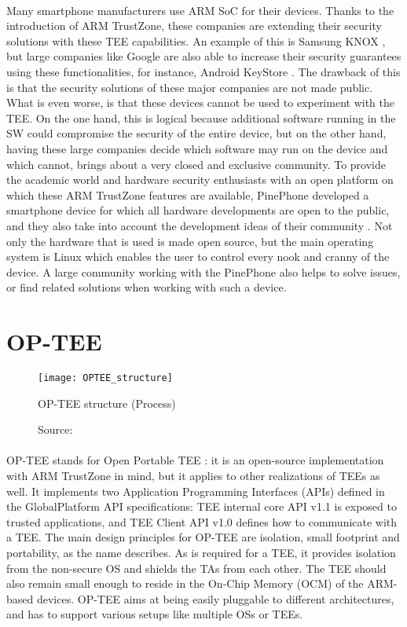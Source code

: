 \paragraph*{}
Many smartphone manufacturers use ARM SoC for their devices. Thanks to the introduction of ARM TrustZone, these companies are extending their security solutions with these TEE capabilities. An example of this is Samsung KNOX \cite{KNOX}, but large companies like Google are also able to increase their security guarantees using these functionalities, for instance, Android KeyStore \cite{KeyStore}. The drawback of this is that the security solutions of these major companies are not made public. What is even worse, is that these devices cannot be used to experiment with the TEE. On the one hand, this is logical because additional software running in the SW could compromise the security of the entire device, but on the other hand, having these large companies decide which software may run on the device and which cannot, brings about a very closed and exclusive community. To provide the academic world and hardware security enthusiasts with an open platform on which these ARM TrustZone features are available, PinePhone developed a smartphone device for which all hardware developments are open to the public, and they also take into account the development ideas of their community \cite{PinePhone}. Not only the hardware that is used is made open source, but the main operating system is Linux \cite{PineSoft} which enables the user to control every nook and cranny of the device. A large community working with the PinePhone also helps to solve issues, or find related solutions when working with such a device.

\section{OP-TEE}

\begin{figure}[h]
\centering
\texttt{[image: OPTEE\_structure]}
\caption{OP-TEE structure (Process)}
\caption*{Source: \cite{OP-TEE_structure}}
\label{OPTEE}
\end{figure}

\paragraph*{}
OP-TEE stands for Open Portable TEE \cite{OP-TEE}: it is an open-source implementation with ARM TrustZone in mind, but it applies to other realizations of TEEs as well. It implements two Application Programming Interfaces (APIs) defined in the GlobalPlatform API specifications: TEE internal core API v1.1 \cite{TEECoreAPI} is exposed to trusted applications, and TEE Client API v1.0 \cite{TEEClientAPI} defines how to communicate with a TEE. The main design principles for OP-TEE are isolation, small footprint and portability, as the name describes. As is required for a TEE, it provides isolation from the non-secure OS and shields the TAs from each other. The TEE should also remain small enough to reside in the On-Chip Memory (OCM) of the ARM-based devices. OP-TEE aims at being easily pluggable to different architectures, and has to support various setups like multiple OSs or TEEs. 

